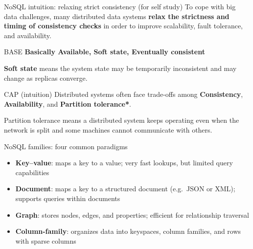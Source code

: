 \documentclass[10pt,aspectratio=169]{beamer}
\begin{document}
\begin{frame}{NoSQL intuition: relaxing strict consistency (for self study)}
\small
To cope with big data challenges, many distributed data systems
\textbf{relax the strictness and timing of consistency checks} in order
to improve scalability, fault tolerance, and availability.

\begin{block}{BASE}
\textbf{Basically Available, Soft state, Eventually consistent}

\medskip
\textbf{Soft state} means the system state may be temporarily inconsistent
and may change as replicas converge.
\end{block}

\begin{block}{CAP (intuition)}
Distributed systems often face trade-offs among
\textbf{Consistency}, \textbf{Availability}, and \textbf{Partition tolerance*}.
\end{block}

{\scriptsize *Partition tolerance means a distributed system keeps operating even when the network is split and some machines cannot communicate with others.}
\end{frame}

\begin{frame}{NoSQL families: four common paradigms}
\begin{itemize}
  \item \textbf{Key--value}: maps a key to a value; very fast lookups, but limited query capabilities
  \item \textbf{Document}: maps a key to a structured document (e.g.\ JSON or XML); supports queries within documents
  \item \textbf{Graph}: stores nodes, edges, and properties; efficient for relationship traversal
  \item \textbf{Column-family}: organizes data into keyspaces, column families, and rows with sparse columns
\end{itemize}
\end{frame}
\end{document}
